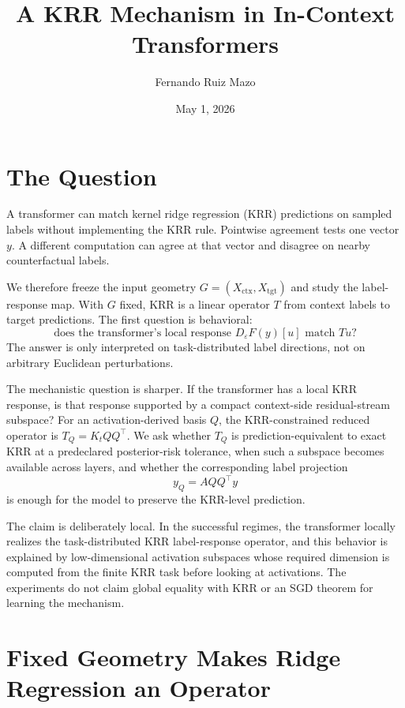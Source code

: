 \documentclass[11pt]{article}
\title{A KRR Mechanism in In-Context Transformers}
\author{Fernando Ruiz Mazo}
\date{May 1, 2026}
\begin{document}
\maketitle

\section{The Question}

A transformer can match kernel ridge regression (KRR) predictions on sampled labels without
implementing the KRR rule. Pointwise agreement tests one vector \(y\). A different computation can
agree at that vector and disagree on nearby counterfactual labels.

We therefore freeze the input geometry \(G=(X_{\mathrm{ctx}},X_{\mathrm{tgt}})\) and study the
label-response map. With \(G\) fixed, KRR is a linear operator \(T\) from context labels to target
predictions. The first question is behavioral:
\[
\text{does the transformer's local response }D_\varepsilon F(y)[u]\text{ match }Tu?
\]
The answer is only interpreted on task-distributed label directions, not on arbitrary Euclidean
perturbations.

The mechanistic question is sharper. If the transformer has a local KRR response, is that response
supported by a compact context-side residual-stream subspace? For an activation-derived basis \(Q\),
the KRR-constrained reduced operator is \(T_Q=K_tQQ^\top\). We ask whether \(T_Q\) is
prediction-equivalent to exact KRR at a predeclared posterior-risk tolerance, when such a subspace
becomes available across layers, and whether the corresponding label projection
\[
y_Q=AQQ^\top y
\]
is enough for the model to preserve the KRR-level prediction.

The claim is deliberately local. In the successful regimes, the transformer locally realizes the
task-distributed KRR label-response operator, and this behavior is explained by low-dimensional
activation subspaces whose required dimension is computed from the finite KRR task before looking at
activations. The experiments do not claim global equality with KRR or an SGD theorem for learning
the mechanism.

\section{Fixed Geometry Makes Ridge Regression an Operator}
\end{document}
